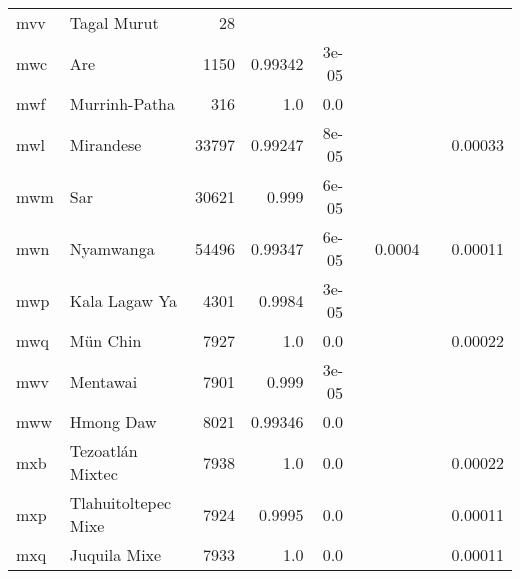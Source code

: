 \documentclass[11pt]{article}
\begin{document}
\begin{table*}[h]
{\begin{tabular}{llrrrrrrr}
mvv         & Tagal Murut         & 28         &          &          &          &          &          &          \\

mwc         & Are         & 1150         & 0.99342         & 3e-05         &          &          &          &          \\

mwf         & Murrinh-Patha         & 316         & 1.0         & 0.0         &          &          &          &          \\

mwl         & Mirandese         & 33797         & 0.99247         & 8e-05         &          &          &          & 0.00033         \\

mwm         & Sar         & 30621         & 0.999         & 6e-05         &          &          &          &          \\

mwn         & Nyamwanga         & 54496         & 0.99347         & 6e-05         &          & 0.0004         &          & 0.00011         \\

mwp         & Kala Lagaw Ya         & 4301         & 0.9984         & 3e-05         &          &          &          &          \\

mwq         & Mün Chin         & 7927         & 1.0         & 0.0         &          &          &          & 0.00022         \\

mwv         & Mentawai         & 7901         & 0.999         & 3e-05         &          &          &          &          \\

mww         & Hmong Daw         & 8021         & 0.99346         & 0.0         &          &          &          &          \\

mxb         & Tezoatlán Mixtec         & 7938         & 1.0         & 0.0         &          &          &          & 0.00022         \\

mxp         & Tlahuitoltepec Mixe         & 7924         & 0.9995         & 0.0         &          &          &          & 0.00011         \\

mxq         & Juquila Mixe         & 7933         & 1.0         & 0.0         &          &          &          & 0.00011         \\


\end{tabular}}
\end{table*}
\end{document}
